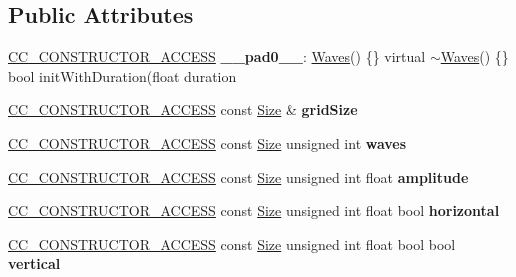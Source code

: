 \subsection*{Public Attributes}
\begin{DoxyCompactItemize}
\item 
\mbox{\label{classWaves_a6129fad24317ad74205f69daeff5ebda}} 
\hyperlink{_2cocos2d_2cocos_2base_2ccConfig_8h_a25ef1314f97c35a2ed3d029b0ead6da0}{C\+C\+\_\+\+C\+O\+N\+S\+T\+R\+U\+C\+T\+O\+R\+\_\+\+A\+C\+C\+E\+SS} {\bfseries \+\_\+\+\_\+pad0\+\_\+\+\_\+}\+: \hyperlink{classWaves}{Waves}() \{\} virtual $\sim$\hyperlink{classWaves}{Waves}() \{\} bool init\+With\+Duration(float duration
\item 
\mbox{\label{classWaves_a20160518cb8283b171b55856de36e7f2}} 
\hyperlink{_2cocos2d_2cocos_2base_2ccConfig_8h_a25ef1314f97c35a2ed3d029b0ead6da0}{C\+C\+\_\+\+C\+O\+N\+S\+T\+R\+U\+C\+T\+O\+R\+\_\+\+A\+C\+C\+E\+SS} const \hyperlink{classSize}{Size} \& {\bfseries grid\+Size}
\item 
\mbox{\label{classWaves_ac540e033163adb568c8273a903128b0d}} 
\hyperlink{_2cocos2d_2cocos_2base_2ccConfig_8h_a25ef1314f97c35a2ed3d029b0ead6da0}{C\+C\+\_\+\+C\+O\+N\+S\+T\+R\+U\+C\+T\+O\+R\+\_\+\+A\+C\+C\+E\+SS} const \hyperlink{classSize}{Size} unsigned int {\bfseries waves}
\item 
\mbox{\label{classWaves_a42f7be6b1ed6831e951db6efe0b59856}} 
\hyperlink{_2cocos2d_2cocos_2base_2ccConfig_8h_a25ef1314f97c35a2ed3d029b0ead6da0}{C\+C\+\_\+\+C\+O\+N\+S\+T\+R\+U\+C\+T\+O\+R\+\_\+\+A\+C\+C\+E\+SS} const \hyperlink{classSize}{Size} unsigned int float {\bfseries amplitude}
\item 
\mbox{\label{classWaves_a5f22f1dfd0630aad3e1759d42027f10b}} 
\hyperlink{_2cocos2d_2cocos_2base_2ccConfig_8h_a25ef1314f97c35a2ed3d029b0ead6da0}{C\+C\+\_\+\+C\+O\+N\+S\+T\+R\+U\+C\+T\+O\+R\+\_\+\+A\+C\+C\+E\+SS} const \hyperlink{classSize}{Size} unsigned int float bool {\bfseries horizontal}
\item 
\mbox{\label{classWaves_af98aa01fcd8056d2cb48cd4a7c6c2eae}} 
\hyperlink{_2cocos2d_2cocos_2base_2ccConfig_8h_a25ef1314f97c35a2ed3d029b0ead6da0}{C\+C\+\_\+\+C\+O\+N\+S\+T\+R\+U\+C\+T\+O\+R\+\_\+\+A\+C\+C\+E\+SS} const \hyperlink{classSize}{Size} unsigned int float bool bool {\bfseries vertical}
\end{DoxyCompactItemize}
